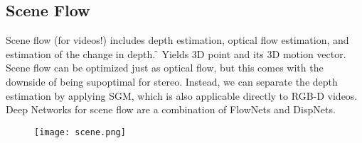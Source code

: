 \subsection{Scene Flow}
Scene flow (for videos!) includes depth estimation, optical flow estimation, and estimation of the change in depth. \f{\to} Yields 3D point and its 3D motion vector.\\

Scene flow can be optimized just as optical flow, but this comes with the downside of being supoptimal for stereo. 
Instead, we can separate the depth estimation by applying SGM, which is also applicable directly to RGB-D videos.\\

Deep Networks for scene flow are a combination of FlowNets and DispNets.
\vspace{2cm}
\begin{figure}[h!]
    \centering
    \texttt{[image: scene.png]}
\end{figure}

\newpage